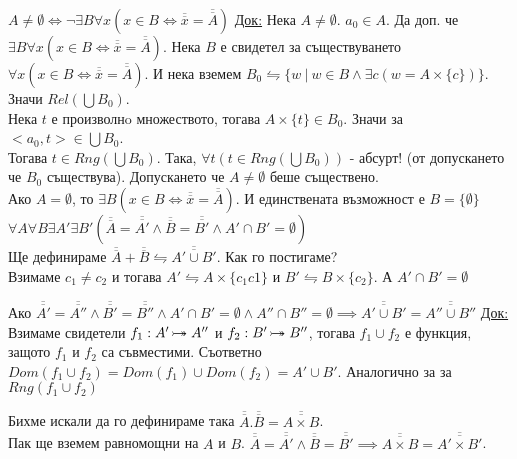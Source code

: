 \documentclass[fleqn, titlepage, 12pt]{report}
\newcommand*\rightbijectionarrow{\mathrel{\ooalign{
  $\twoheadrightarrow$\cr\hidewidth\hbox{$\rightarrowtail\mkern 1mu$}\cr }}}
\begin{document}
 $A \neq \emptyset \Longleftrightarrow \lnot \exists{B}\forall{x}(x \in B \Leftrightarrow \overline{\overline{x}} = \overline{\overline{A}})$
\bigbreak
\underline{Док:} Нека $A \neq \emptyset$. $a_0 \in A$. Да доп. че $\exists{B}\forall{x}(x \in B
\Leftrightarrow \overline{\overline{x}} = \overline{\overline{A}})$.
Нека $B$ е свидетел за съществуването $\forall{x}(x \in B
\Leftrightarrow \overline{\overline{x}} = \overline{\overline{A}})$.
И нека вземем $B_0 \leftrightharpoons \{w\ |\ w \in B \land \exists{c}(w = A \times \{ c \})\}$.
Значи $Rel(\bigcup B_0)$.\\
Нека $t$ е произволнo множеството, тогава $A \times \{ t \} \in B_0$. Значи за $<a_0,t> \in \bigcup B_0$.\\
Тогава $t \in Rng(\bigcup B_0)$. Така, $\forall{t}(t \in Rng(\bigcup B_0))$ - абсурт! (от допускането че $B_0$ съществува).
\bigbreak
Допускането че $A \neq \emptyset$ беше съществено.\\
Ако $A = \emptyset$, то $\exists{B}(x \in B \Leftrightarrow \overline{\overline{x}} = \overline{\overline{A}})$.
И единствената възможност е $B = \{ \emptyset \}$
\bigbreak
{} $\forall{A}\forall{B}\exists{A'}\exists{B'}(\overline{\overline{A}} = \overline{\overline{A'}}
\land \overline{\overline{B}} = \overline{\overline{B'}} \land A' \cap B' = \emptyset )$\\
Ще дефинираме $\overline{\overline{A}} + \overline{\overline{B}} \leftrightharpoons \overline{\overline{A' \cup B'}}$.
Как го постигаме?\\
Взимаме $c_1 \neq c_2$ и тогава $A' \leftrightharpoons A \times \{ c_1c1 \}$ и
$B' \leftrightharpoons B \times \{ c_2 \}$. А $A' \cap B' = \emptyset$
\bigbreak

 Ако $\overline{\overline{A'}} = \overline{\overline{A''}}
\land \overline{\overline{B'}} = \overline{\overline{B''}} \land  A' \cap B' = \emptyset
\land  A'' \cap B'' = \emptyset \implies \overline{\overline{A' \cup B'}} = \overline{\overline{A'' \cup B''}}$
\bigbreak
\underline{Док:} Взимаме свидетели $f_1: A' \rightbijectionarrow A''$ и $ f_2: B' \rightbijectionarrow B''$, тогава
$f_1 \cup f_2$ е функция, защото $f_1$ и $f_2$ са съвместими.
Съответно $Dom(f_1 \cup f_2) = Dom(f_1) \cup Dom(f_2) = A' \cup B'$. Аналогично за за $Rng(f_1 \cup f_2)$
\bigbreak

 Бихме искали да го дефинираме така
$\overline{\overline{A}}.\overline{\overline{B}} = \overline{\overline{A \times B}}$.\\
Пак ще вземем равномощни на $A$ и $B$.
$\overline{\overline{A}} = \overline{\overline{A'}} \land  \overline{\overline{B}} = \overline{\overline{B'}} \implies
\overline{\overline{A \times  B}} = \overline{\overline{A' \times  B'}}$.
\bigbreak
\end{document}
